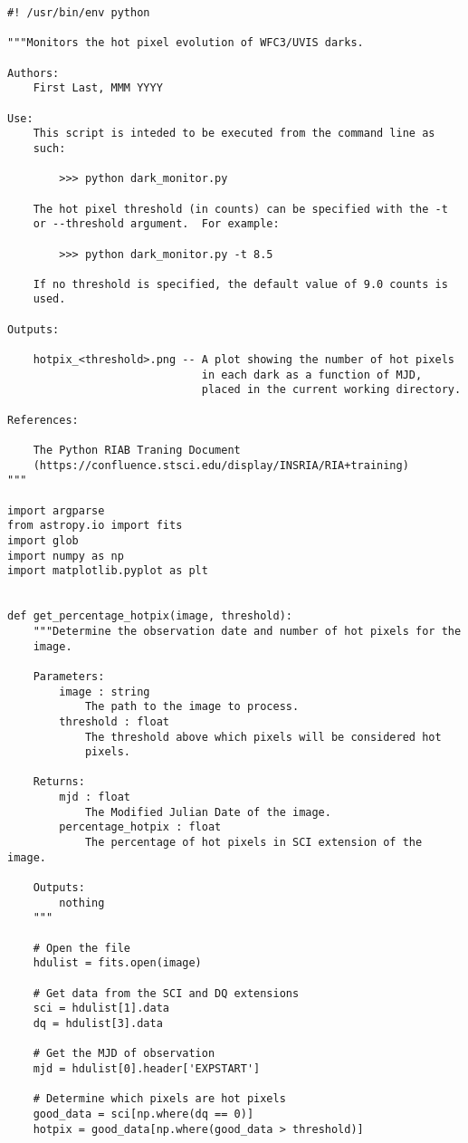 \begin{verbatim}
#! /usr/bin/env python

"""Monitors the hot pixel evolution of WFC3/UVIS darks.

Authors:
    First Last, MMM YYYY

Use:
    This script is inteded to be executed from the command line as
    such:

        >>> python dark_monitor.py

    The hot pixel threshold (in counts) can be specified with the -t 
    or --threshold argument.  For example:

        >>> python dark_monitor.py -t 8.5

    If no threshold is specified, the default value of 9.0 counts is 
    used.

Outputs:

    hotpix_<threshold>.png -- A plot showing the number of hot pixels 
                              in each dark as a function of MJD, 
                              placed in the current working directory.

References:

    The Python RIAB Traning Document
    (https://confluence.stsci.edu/display/INSRIA/RIA+training)
"""

import argparse
from astropy.io import fits
import glob
import numpy as np
import matplotlib.pyplot as plt


def get_percentage_hotpix(image, threshold):
    """Determine the observation date and number of hot pixels for the
    image.

    Parameters:
        image : string
            The path to the image to process.
        threshold : float
            The threshold above which pixels will be considered hot
            pixels.

    Returns:
        mjd : float
            The Modified Julian Date of the image.
        percentage_hotpix : float
            The percentage of hot pixels in SCI extension of the image.

    Outputs:
        nothing
    """

    # Open the file
    hdulist = fits.open(image)

    # Get data from the SCI and DQ extensions
    sci = hdulist[1].data
    dq = hdulist[3].data

    # Get the MJD of observation
    mjd = hdulist[0].header['EXPSTART']

    # Determine which pixels are hot pixels
    good_data = sci[np.where(dq == 0)]
    hotpix = good_data[np.where(good_data > threshold)]


\end{verbatim}

